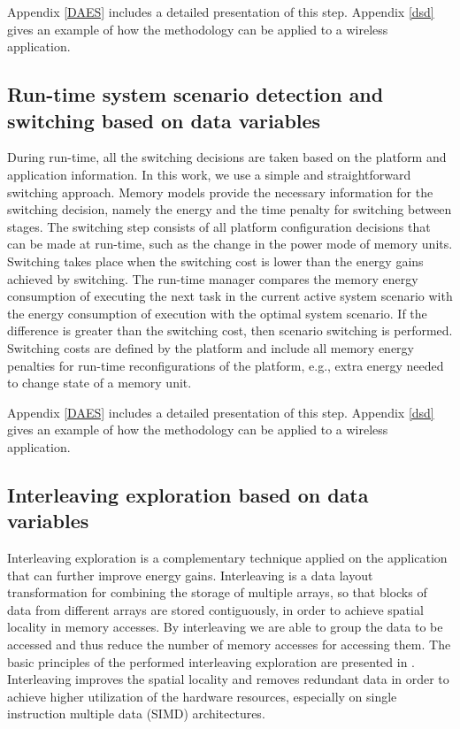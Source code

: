 Appendix \ref{DAES} includes a detailed presentation of this step. Appendix \ref{dsd} gives an example of how the methodology can be applied to a wireless application.

\subsection{Run-time system scenario detection and switching based on data variables}

During run-time, all the switching decisions are taken based on the platform and application information. 
In this work, we use a simple and straightforward switching approach.
Memory models provide the necessary information for the switching decision, namely the energy and the time penalty for switching between stages.
The switching step consists of all platform configuration decisions that can be made at run-time, such as the change in the power mode of memory units.
Switching takes place when the switching cost is lower than the energy gains achieved by switching. 
The run-time manager compares the memory energy consumption of executing the next task in the current active system scenario with the energy consumption of execution with the optimal system scenario. 
If the difference is greater than the switching cost, then scenario switching is performed.
Switching costs are defined by the platform and include all memory energy penalties for run-time reconfigurations of the platform, e.g., extra energy needed to change state of a memory unit.

Appendix \ref{DAES} includes a detailed presentation of this step. Appendix \ref{dsd} gives an example of how the methodology can be applied to a wireless application.

\subsection{Interleaving exploration based on data variables}

Interleaving exploration is a complementary technique applied on the application that can further improve energy gains.
Interleaving is a data layout transformation for combining the storage of multiple arrays, so that blocks of data from different arrays are stored contiguously, in order to achieve spatial locality in memory accesses.
By interleaving we are able to group the data to be accessed and thus reduce the number of memory accesses for accessing them.
The basic principles of the performed interleaving exploration are presented in \cite{sharma2013data}.
Interleaving improves the spatial locality and removes redundant data in order to achieve higher  utilization of the hardware resources, especially on single instruction multiple data (SIMD)  architectures.

